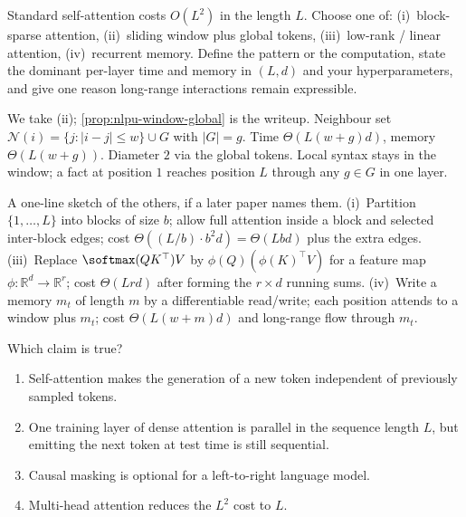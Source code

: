 \begin{exercise}
\label{ex:nlpu-long-attn}
Standard self-attention costs $O(L^2)$ in the length $L$. Choose one of: (i)~block-sparse attention, (ii)~sliding window plus global tokens, (iii)~low-rank / linear attention, (iv)~recurrent memory. Define the pattern or the computation, state the dominant per-layer time and memory in $(L,d)$ and your hyperparameters, and give one reason long-range interactions remain expressible.
\end{exercise}

\begin{solution}
We take (ii); \cref{prop:nlpu-window-global} is the writeup. Neighbour set $\mathcal{N}(i)=\{j:\lvert i-j\rvert\le w\}\cup G$ with $\lvert G\rvert=g$. Time $\Theta(L(w+g)d)$, memory $\Theta(L(w+g))$. Diameter $2$ via the global tokens. Local syntax stays in the window; a fact at position $1$ reaches position $L$ through any $g\in G$ in one layer.

A one-line sketch of the others, if a later paper names them. (i)~Partition $\{1,\dots,L\}$ into blocks of size $b$; allow full attention inside a block and selected inter-block edges; cost $\Theta((L/b)\cdot b^2 d)=\Theta(Lbd)$ plus the extra edges. (iii)~Replace $\softmax(QK^\top)V$ by $\phi(Q)(\phi(K)^\top V)$ for a feature map $\phi:\mathbb{R}^d\to\mathbb{R}^r$; cost $\Theta(Lrd)$ after forming the $r\times d$ running sums. (iv)~Write a memory $m_t$ of length $m$ by a differentiable read/write; each position attends to a window plus $m_t$; cost $\Theta(L(w+m)d)$ and long-range flow through $m_t$.
\end{solution}

\begin{exercise}
\label{ex:nlpu-serial-decode}
Which claim is true?
\begin{enumerate}[label=(\alph*)]
    \item Self-attention makes the generation of a new token independent of previously sampled tokens.
    \item One training layer of dense attention is parallel in the sequence length $L$, but emitting the next token at test time is still sequential.
    \item Causal masking is optional for a left-to-right language model.
    \item Multi-head attention reduces the $L^2$ cost to $L$.
\end{enumerate}
\end{exercise}

